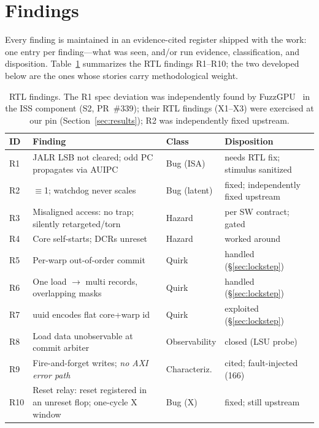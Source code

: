 \documentclass[review,12pt]{elsarticle}
\newcommand{\code}[1]{\texttt{\detokenize{#1}}}
\begin{document}
\section{Findings}
\label{sec:rtlfindings}
Every finding is maintained in an evidence-cited register shipped
with the work: one entry per finding---what was seen,
\code{file:line} and/or run evidence, classification, and
disposition. Table~\ref{tab:rtlobs} summarizes the RTL findings
R1--R10; the two developed below are the ones whose stories carry
methodological weight.

\begin{table}[t]
	\caption{RTL findings. The R1 spec deviation was independently found
		by FuzzGPU~\cite{fuzzgpu} in the ISS component (S2, PR~\#339); their
		RTL findings (X1--X3) were exercised at our pin
		(Section~\ref{sec:results}); R2 was independently fixed upstream.}
	\label{tab:rtlobs}
	\centering
	\scriptsize
	\begin{tabular}{p{0.4cm}p{3.3cm}p{1.7cm}p{1.4cm}}
		\toprule
		ID  & Finding                                                              & Class         & Disposition                         \\
		\midrule
		R1  & JALR LSB not cleared; odd PC propagates via AUIPC                    & Bug (ISA)     & needs RTL fix; stimulus sanitized   \\
		R2  & \code{STALL_TIMEOUT} \code{1**N}$\equiv$1; watchdog never scales     & Bug (latent)  & fixed; independently fixed upstream \\
		R3  & Misaligned access: no trap; silently retargeted/torn                 & Hazard        & per SW contract; gated              \\
		R4  & Core self-starts; DCRs unreset                                       & Hazard        & worked around                       \\
		R5  & Per-warp out-of-order commit                                         & Quirk         & handled (\S\ref{sec:lockstep})      \\
		R6  & One load $\to$ multi records, overlapping masks                      & Quirk         & handled (\S\ref{sec:lockstep})      \\
		R7  & uuid encodes flat core+warp id                                       & Quirk         & exploited (\S\ref{sec:lockstep})    \\
		R8  & Load data unobservable at commit arbiter                             & Observability & closed (LSU probe)                  \\
		R9  & Fire-and-forget writes; \emph{no AXI error path}                     & Characteriz.  & cited; fault-injected (166)         \\
		R10 & Reset relay: reset registered in an unreset flop; one-cycle X window & Bug (X)       & fixed; still upstream               \\
		\bottomrule
	\end{tabular}
\end{table}
\end{document}
